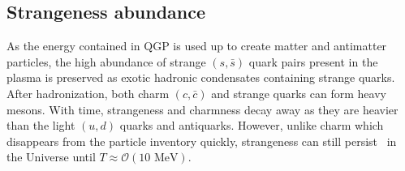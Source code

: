 \documentclass[universe,article,submit,moreauthors,pdftex,a4paper]{Definitions/mdpi}
\newcommand{\MeV}{\text{ MeV}}
\begin{document}
\subsection{Strangeness abundance}\label{sec:Strangeness}
\noindent As the energy contained in QGP is used up to create matter and antimatter particles, the high abundance of strange $(s,\bar{s})$ quark pairs present in the plasma is preserved as exotic hadronic condensates containing strange quarks. After hadronization, both charm $(c,\bar{c})$ and strange quarks can form heavy mesons. With time, strangeness and charmness decay away as they are heavier than the light $(u,d)$ quarks and antiquarks. However, unlike charm which disappears from the particle inventory quickly, strangeness can still persist~\cite{Yang:2021bko} in the Universe until $T\approx\mathcal{O}(10\MeV)$.
\end{document}
